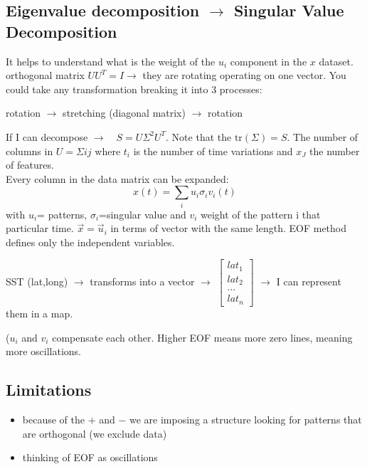 \subsection{Eigenvalue decomposition $\rightarrow$ Singular Value Decomposition}
It helps to understand what is the weight of the $u_i$ component in the $x$ dataset.
\\


orthogonal matrix $UU^T=I\rightarrow$ they are rotating operating on one vector. You could take any transformation breaking it into 3 processes:
\begin{center}
    rotation $\rightarrow$ stretching (diagonal matrix) $\rightarrow$ rotation
\end{center}
If I can decompose $\rightarrow \quad S=U\Sigma^2U^T$. Note that the $\text{tr}(\Sigma)=S$. The number of columns in $U=\Sigma ij$ where $t_i$ is the number of time variations and $x_J$ the number of features. 
\\


Every column in the data matrix can be expanded: 
\begin{equation*}
    x(t)=\sum_iu_i\sigma_iv_i(t)
\end{equation*}
with $u_i$= patterns, $\sigma_i$=singular value and $v_i$ weight of the pattern i that particular time. $\vec{x}=\vec{u}_i$ in terms of vector with the same length. EOF method defines only the independent variables. 

    SST (lat,long) $\rightarrow$ transforms into a vector $\rightarrow$ $\begin{bmatrix}
        lat_1\\
        lat_2\\
        ...\\
        lat_n
    \end{bmatrix}$ $\rightarrow$ I can represent them in a map.

($u_i$ and $v_i$ compensate each other. Higher EOF means more zero lines, meaning more oscillations. 
\subsection{Limitations}
\begin{itemize}
    \item because of the $+$ and $-$ we are imposing a structure looking for patterns that are orthogonal (we exclude data)
    \item thinking of EOF as oscillations
\end{itemize}

